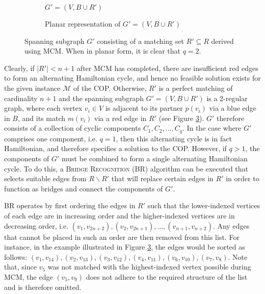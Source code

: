 \documentclass[oribibl]{llncs}
\begin{document}
\begin{figure}	
	\centering
	\begin{subfigure}[t]{0.4\textwidth}
		
		\caption{$G' = (V, B \cup R')$}	
		\label{fig:matching}
	\end{subfigure} \quad
	\begin{subfigure}[t]{0.57\textwidth}
		
		\caption{Planar representation of $G' =(V, B \cup R')$}	
		\label{fig:mps}
	\end{subfigure}
	\caption{Spanning subgraph $G'$ consisting of a matching set $R' \subseteq R$ derived using MCM. When in planar form, it is clear that $q = 2$.}
	\label{fig:matching/mps}
\end{figure}

Clearly, if $|R'| < n+1$ after MCM has completed, there are insufficient red edges to form an alternating Hamiltonian cycle, and hence no feasible solution exists for the given instance $\mathcal{M}$ of the COP. Otherwise, $R'$ is a perfect matching of cardinality $n+1$ and the spanning subgraph $G'=(V, B \cup R')$ is a 2-regular graph, where each vertex $v_i \in V$ is adjacent to its partner $p(v_i)$ via a blue edge in $B$, and its match $m(v_i)$ via a red edge in $R'$ (see Figure \ref{fig:matching/mps}). $G'$ therefore consists of a collection of cyclic components $C_1, C_2, ..., C_q$. In the case where $G'$ comprises one component, i.e. $q = 1$, then this alternating cycle is in fact Hamiltonian, and therefore specifies a solution to the COP. However, if $q > 1$, the components of $G'$ must be combined to form a single alternating Hamiltonian cycle. To do this, a \textsc{Bridge Recognition} (BR) algorithm can be executed that selects suitable edges from $R\backslash R'$ that will replace certain edges in $R'$ in order to function as bridges and connect the components of $G'$.

BR operates by first ordering the edges in $R'$ such that the lower-indexed vertices of each edge are in increasing order and the higher-indexed vertices are in decreasing order, i.e. $(v_1, v_{2n+2}), (v_2, v_{2n+1}), ..., (v_{n+1}, v_{n+2})$. Any edges that cannot be placed in such an order are then removed from this list. For instance, in the example illustrated in Figure \ref{fig:matching/mps}, the edges would be sorted as follows: $(v_1, v_{14}), (v_2, v_{13}),(v_3, v_{12}),(v_4, v_{11}),(v_6, v_{10}),(v_7, v_8)$. Note that, since $v_5$ was not matched with the highest-indexed vertex possible during MCM, the edge $(v_5, v_9)$ does not adhere to the required structure of the list and is therefore omitted.
\end{document}
